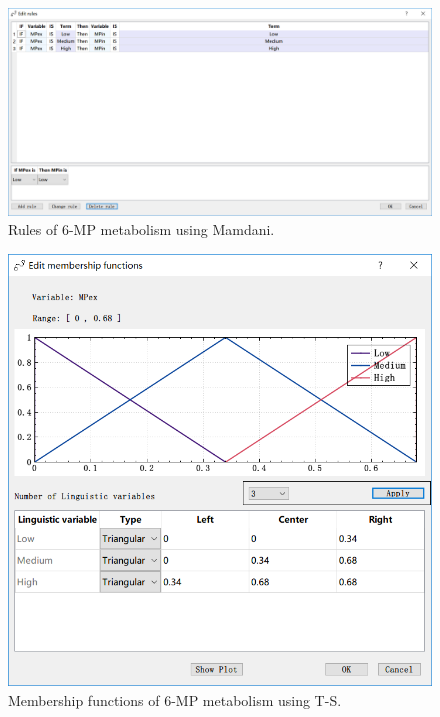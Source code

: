 \documentclass[journal,a4paper,onecolumn]{article}
\begin{document}
\begin{figure}[!hbt]
	\begin{center}
		\includegraphics[width=\columnwidth]{fig59}
		\caption{Rules of 6-MP metabolism using Mamdani.}
		\label{fig:Rules of 6-MP metabolism using Mamdani.}
	\end{center}
\end{figure}
\begin{figure}[!hbt]
	\begin{center}
		\includegraphics[width=\columnwidth]{fig57}
		\caption{Membership functions of 6-MP metabolism using T-S.}
		\label{fig:Membership functions of 6-MP metabolism using T-S.}
	\end{center}
\end{figure}
\end{document}
